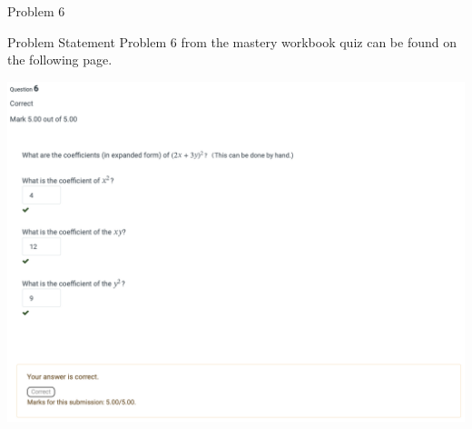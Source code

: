 \begin{problem}{Problem 6}
    \begin{statement}{Problem Statement}
        Problem 6 from the mastery workbook quiz can be found on the following page.
    \end{statement}
    \begin{highlight}[Solution]
        \begin{center}
            \includegraphics[width = 1.0\textwidth]{Images/Problem 6.png}
        \end{center}
    \end{highlight}
\end{problem}

